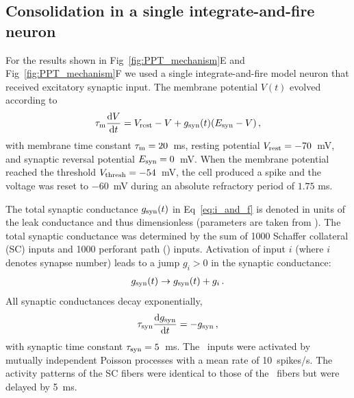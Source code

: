 
\subsection{Consolidation in a single integrate-and-fire neuron}%
\label{ssec:ppt_methods_LIF}
For the results shown in Fig~\ref{fig:PPT_mechanism}E and  Fig~\ref{fig:PPT_mechanism}F we used a single integrate-and-fire  model neuron that received excitatory synaptic input. The membrane potential $V(t)$ %
evolved according to
\begin{align}
\tau_{\rm m}\frac{{\rm d} V}{{\rm d} t} = V_{\rm rest} - V + g_{\rm syn}(t)(E_{\rm syn}-V)\,,\label{eq:i_and_f}
\end{align}
with membrane time constant $\tau_{\rm m} = 20$~ms, resting potential $V_{\rm rest} = -70$~mV, and synaptic reversal potential $E_{\rm syn}=0$~mV. When the membrane potential reached the threshold $V_{\rm thresh}=-54$~mV, the cell produced a spike and the voltage was reset to $-60$~mV during an absolute refractory period of $1.75$ ms.

The total synaptic conductance $g_{\rm syn}(t)$ in Eq~\eqref{eq:i_and_f} is denoted in units of the leak conductance and thus dimensionless (parameters are taken from \cite{Troyer1997}). The total synaptic conductance was determined by the sum of 1000 Schaffer collateral (SC) inputs and 1000 perforant path (\ppca) inputs. Activation of input $i$ (where $i$ denotes synapse number) leads to a jump $g_i>0$ in the synaptic conductance:
\begin{align}
g_{\rm syn}(t)\rightarrow g_{\rm syn}(t)+g_i\, .
\end{align}
All synaptic conductances decay exponentially,
\begin{align}
\tau_{\rm syn}\frac{{\rm d} g_{\rm syn}}{{\rm d} t} = -g_{\rm syn}\, ,
\end{align}
with synaptic time constant $\tau_{\rm syn}=5$~ms. The \ppca~inputs were activated by mutually independent Poisson processes with a mean rate of 10~spikes/s. The activity patterns of the SC fibers were identical to those of the \ppca~fibers but were delayed by 5~ms.

